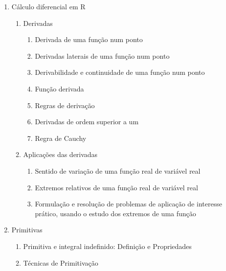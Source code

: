 \documentclass[
]{book}
\providecommand{\tightlist}{%
  \setlength{\itemsep}{0pt}\setlength{\parskip}{0pt}}
\begin{document}
\begin{enumerate}
\def\labelenumi{\arabic{enumi}.}
\tightlist
\item
  Cálculo diferencial em R

  \begin{enumerate}
  \def\labelenumii{(\alph{enumii})}
  \tightlist
  \item
    Derivadas

    \begin{enumerate}
    \def\labelenumiii{\roman{enumiii}.}
    \tightlist
    \item
      Derivada de uma função num ponto\\
    \item
      Derivadas laterais de uma função num ponto\\
    \item
      Derivabilidade e continuidade de uma função num ponto\\
    \item
      Função derivada\\
    \item
      Regras de derivação\\
    \item
      Derivadas de ordem superior a um\\
    \item
      Regra de Cauchy\\
    \end{enumerate}
  \item
    Aplicações das derivadas

    \begin{enumerate}
    \def\labelenumiii{\roman{enumiii}.}
    \tightlist
    \item
      Sentido de variação de uma função real de variável real\\
    \item
      Extremos relativos de uma função real de variável real\\
    \item
      Formulação e resolução de problemas de aplicação de interesse prático, usando o estudo dos extremos de uma função\\
    \end{enumerate}
  \end{enumerate}
\item
  Primitivas

  \begin{enumerate}
  \def\labelenumii{(\alph{enumii})}
  \tightlist
  \item
    Primitiva e integral indefinido: Definição e Propriedades\\
  \item
    Técnicas de Primitivação


\end{enumerate}
\end{enumerate}
\end{document}
